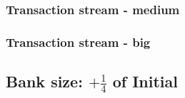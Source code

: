 \documentclass{article}
\begin{document}
\subsubsection{Transaction stream - medium}

\subsubsection{Transaction stream - big}

\subsection{Bank size: $+\frac{1}{4}$ of Initial}

\cite{angles2008survey}

\end{document}
